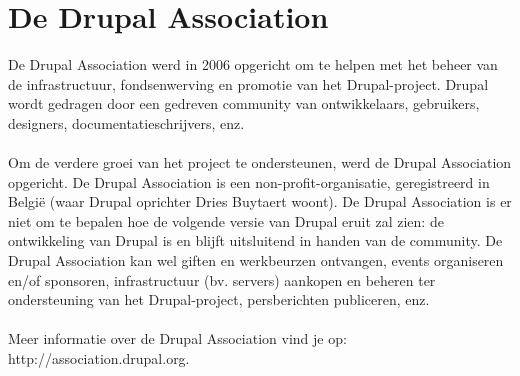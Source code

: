  \section{De Drupal Association}
 De Drupal Association werd in 2006 opgericht om te helpen met het beheer van de
 infrastructuur, fondsenwerving en promotie van het Drupal-project. Drupal wordt gedragen door een 
 gedreven community van ontwikkelaars, gebruikers, designers,
 documentatieschrijvers, enz.\\
\\
Om de verdere groei van het project te ondersteunen, werd de Drupal Association
opgericht. De Drupal Association is een non-profit-organisatie, geregistreerd in
Belgi\"e (waar Drupal oprichter Dries Buytaert woont). De Drupal Association is
er niet om te bepalen hoe de volgende versie van Drupal eruit zal zien: de ontwikkeling van Drupal is en blijft uitsluitend 
in handen van de community. De Drupal Association kan wel giften en werkbeurzen ontvangen, 
events organiseren en/of sponsoren, infrastructuur (bv. servers) aankopen en beheren ter ondersteuning 
van het Drupal-project, persberichten publiceren, enz.\\
\\
Meer informatie over de Drupal Association vind je op:
http://association.drupal.org.